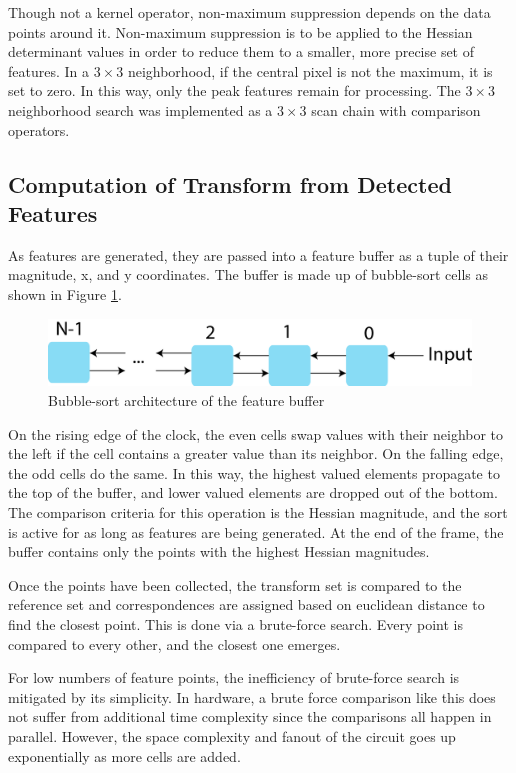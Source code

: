 \documentclass[sigconf]{acmart}
\begin{document}
Though not a kernel operator, non-maximum suppression depends on the data points around it. Non-maximum suppression is to be applied to the Hessian determinant values in order to reduce them to a smaller, more precise set of features. In a $3 \times 3$ neighborhood, if the central pixel is not the maximum, it is set to zero. In this way, only the peak features remain for processing. The $3 \times 3$ neighborhood search was implemented as a $3 \times 3$ scan chain with comparison operators.

\subsection{Computation of Transform from Detected Features}

As features are generated, they are passed into a feature buffer as a tuple of their magnitude, x, and y coordinates. The buffer is made up of bubble-sort cells as shown in Figure \ref{fig_bubblesort}.

\begin{figure}[h]
	\centering
	\includegraphics[width=\columnwidth]{figures/block/bubblesort}
	\caption{Bubble-sort architecture of the feature buffer}
	\label{fig_bubblesort}
\end{figure}

On the rising edge of the clock, the even cells swap values with their neighbor to the left if the cell contains a greater value than its neighbor. On the falling edge, the odd cells do the same. In this way, the highest valued elements propagate to the top of the buffer, and lower valued elements are dropped out of the bottom. The comparison criteria for this operation is the Hessian magnitude, and the sort is active for as long as features are being generated. At the end of the frame, the buffer contains only the points with the highest Hessian magnitudes.

Once the points have been collected, the transform set is compared to the reference set and correspondences are assigned based on euclidean distance to find the closest point. This is done via a brute-force search. Every point is compared to every other, and the closest one emerges. 

For low numbers of feature points, the inefficiency of brute-force search is mitigated by its simplicity. In hardware, a brute force comparison like this does not suffer from additional time complexity since the comparisons all happen in parallel. However, the space complexity and fanout of the circuit goes up exponentially as more cells are added.
\end{document}
